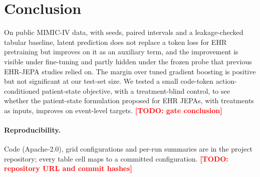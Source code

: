 \documentclass[10pt,letterpaper]{article}
\newcommand{\todo}[1]{\textcolor{red}{\textbf{[TODO: #1]}}}
\begin{document}
\section{Conclusion}

On public MIMIC-IV data, with seeds, paired intervals and a leakage-checked
tabular baseline, latent prediction does not replace a token loss for EHR
pretraining but improves on it as an auxiliary term, and the improvement is
visible under fine-tuning and partly hidden under the frozen probe that
previous EHR-JEPA studies relied on. The margin over tuned gradient boosting is
positive but not significant at our test-set size. We tested a small code-token
action-conditioned patient-state objective, with a treatment-blind control, to see whether
the patient-state formulation proposed for EHR JEPAs, with treatments as inputs,
improves on event-level targets. \todo{gate conclusion}

\paragraph{Reproducibility.}
Code (Apache-2.0), grid configurations and per-run summaries are in the
project repository; every table cell maps to a committed configuration.
\todo{repository URL and commit hashes}



\end{document}
